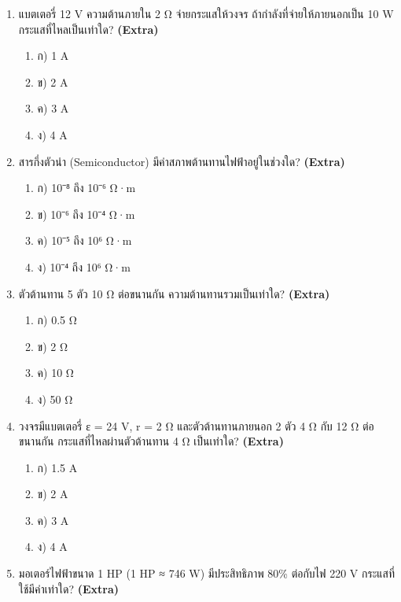 \documentclass[12pt]{article}
\begin{document}
\begin{enumerate}[label=\arabic*.]
\begin{enumerate}[label=)]
\item ก) 1 A
\item ข) 2 A
\item ค) 3 A
\item ง) 4 A
\end{enumerate}
\item แบตเตอรี่ 12 V ความต้านภายใน 2 Ω จ่ายกระแสให้วงจร ถ้ากำลังที่จ่ายให้ภายนอกเป็น 10 W กระแสที่ไหลเป็นเท่าใด? \hfill \textbf{\small (Extra)}
\begin{enumerate}[label=)]
\item ก) 1 A
\item ข) 2 A
\item ค) 3 A
\item ง) 4 A
\end{enumerate}
\item สารกึ่งตัวนำ (Semiconductor) มีค่าสภาพต้านทานไฟฟ้าอยู่ในช่วงใด? \hfill \textbf{\small (Extra)}
\begin{enumerate}[label=)]
\item ก) 10⁻⁸ ถึง 10⁻⁶ Ω·m
\item ข) 10⁻⁶ ถึง 10⁻⁴ Ω·m
\item ค) 10⁻⁵ ถึง 10⁶ Ω·m
\item ง) 10⁻⁴ ถึง 10⁶ Ω·m
\end{enumerate}
\item ตัวต้านทาน 5 ตัว 10 Ω ต่อขนานกัน ความต้านทานรวมเป็นเท่าใด? \hfill \textbf{\small (Extra)}
\begin{enumerate}[label=)]
\item ก) 0.5 Ω
\item ข) 2 Ω
\item ค) 10 Ω
\item ง) 50 Ω
\end{enumerate}
\item วงจรมีแบตเตอรี่ ε = 24 V, r = 2 Ω และตัวต้านทานภายนอก 2 ตัว 4 Ω กับ 12 Ω ต่อขนานกัน กระแสที่ไหลผ่านตัวต้านทาน 4 Ω เป็นเท่าใด? \hfill \textbf{\small (Extra)}
\begin{enumerate}[label=)]
\item ก) 1.5 A
\item ข) 2 A
\item ค) 3 A
\item ง) 4 A
\end{enumerate}
\item มอเตอร์ไฟฟ้าขนาด 1 HP (1 HP ≈ 746 W) มีประสิทธิภาพ 80\% ต่อกับไฟ 220 V กระแสที่ใช้มีค่าเท่าใด? \hfill \textbf{\small (Extra)}
\begin{enumerate}[label=)]

\end{enumerate}
\end{enumerate}
\end{document}
